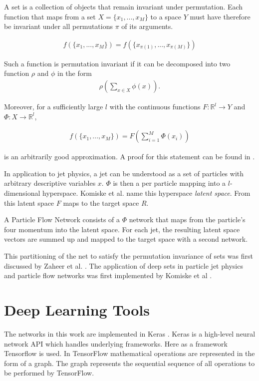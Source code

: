 \documentclass[12pt, a4paper]{thesis}
\begin{document}
A set is a collection of objects that remain invariant under
permutation. Each function that maps from a set \(X = \{x_1, ... , x_M
\}\) to a space \(Y\) must have therefore be invariant under all
permutations $\pi$ of its arguments.

\begin{align}
  f(\{x_1, ... , x_M \}) = f(\{x_{\pi(1)}, ... , x_{\pi(M)}\})
\end{align}

Such a function is permutation invariant if it can be decomposed into
two function $\rho$ and $\phi$ in the form
\begin{align}
  \rho \left(\sum_{x\in X} \phi(x)\right).  
\end{align}

Moreover, for a sufficiently large \(l\) with the continuous functions
\(F: \mathbb{R}^l \rightarrow Y\) and \(\Phi: X \rightarrow
\mathbb{R}^l\),

\begin{align}
  f(\{x_1, ... , x_M \}) = F(\sum_{i=1}^M \Phi(x_i))
\end{align}

is an arbitrarily good approximation. A proof for this statement can be
found in \cite{zaheer17_deep_sets}.

In application to jet physics, a jet can be understood as a set of
particles with arbitrary descriptive variables \(x\). \(\Phi\) is then
a per particle mapping into a \(l\)-dimensional hyperspace.  Komiske
et al. name this hyperspace \emph{latent space}. From this latent
space \(F\) maps to the target space \(R\).

A Particle Flow Network \cite{komiske19_energ_flow_networ} consists of
a \(\Phi\) network that maps from the particle's four momentum into
the latent space. For each jet, the resulting latent space vectors are
summed up and mapped to the target space with a second network.

This partitioning of the net to satisfy the permutation invariance of
sets was first discussed by Zaheer et al.
\cite{zaheer17_deep_sets}. The application of deep sets in particle
jet physics and particle flow networks was first implemented by
Komiske et al \cite{komiske19_energ_flow_networ}.

\section{Deep Learning Tools}

The networks in this work are implemented in Keras
\cite{chollet2015keras}. Keras is a high-level neural network API
which handles underlying frameworks. Here as a framework Tensorflow
\cite{tensorflow2015-whitepaper} is used.  In TensorFlow mathematical
operations are represented in the form of a graph. The graph
represents the sequential sequence of all operations to be performed
by TensorFlow.
\end{document}
